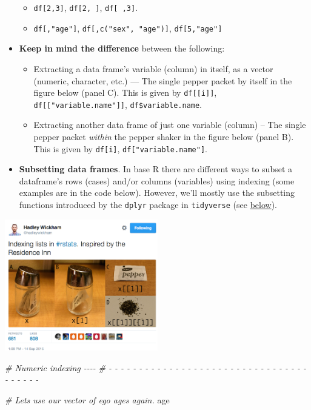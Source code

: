 \documentclass[
]{book}
\newenvironment{Shaded}{\begin{snugshade}}{\end{snugshade}}
\newcommand{\CommentTok}[1]{\textcolor[rgb]{0.56,0.35,0.01}{\textit{#1}}}
\newcommand{\NormalTok}[1]{#1}
\providecommand{\tightlist}{%
  \setlength{\itemsep}{0pt}\setlength{\parskip}{0pt}}
\begin{document}
\begin{itemize}
  \begin{itemize}
  \tightlist
  \item
    \texttt{df{[}2,3{]}}, \texttt{df{[}2,\ {]}}, \texttt{df{[}\ ,3{]}}.
  \item
    \texttt{df{[},"age"{]}}, \texttt{df{[},c("sex",\ "age"){]}}, \texttt{df{[}5,"age"{]}}
  \end{itemize}
\item
  \textbf{Keep in mind the difference} between the following:

  \begin{itemize}
  \tightlist
  \item
    Extracting a data frame's variable (column) in itself, as a vector (numeric, character, etc.) --- The single pepper packet by itself in the figure below (panel C). This is given by \texttt{df{[}{[}i{]}{]}}, \texttt{df{[}{[}"variable.name"{]}{]}}, \texttt{df\$variable.name}.
  \item
    Extracting another data frame of just one variable (column) -- The single pepper packet \emph{within} the pepper shaker in the figure below (panel B). This is given by \texttt{df{[}i{]}}, \texttt{df{[}"variable.name"{]}}.
  \end{itemize}
\item
  \textbf{Subsetting data frames}. In base R there are different ways to subset a dataframe's rows (cases) and/or columns (variables) using indexing (some examples are in the code below). However, we'll mostly use the subsetting functions introduced by the \texttt{dplyr} package in \texttt{tidyverse} (see \protect\hyperlink{the-tidyverse-syntax}{below}).
\end{itemize}

\href{https://twitter.com/hadleywickham/status/643381054758363136?lang=en}{\includegraphics[width=0.5\textwidth,height=\textheight]{./Figures/wickham_indexing_tweet.png}}

\begin{Shaded}
\begin{Highlighting}[]
\CommentTok{\# Numeric indexing                                                          {-}{-}{-}{-}}
\CommentTok{\# {-} {-} {-} {-} {-} {-} {-} {-} {-} {-} {-} {-} {-} {-} {-} {-} {-} {-} {-} {-} {-} {-} {-} {-} {-} {-} {-} {-} {-} {-} {-} {-} {-} {-} {-} {-} {-} {-} {-} }

\CommentTok{\# Let\textquotesingle{}s use our vector of ego ages again.}
\NormalTok{age}
\end{Highlighting}
\end{Shaded}
\end{document}
